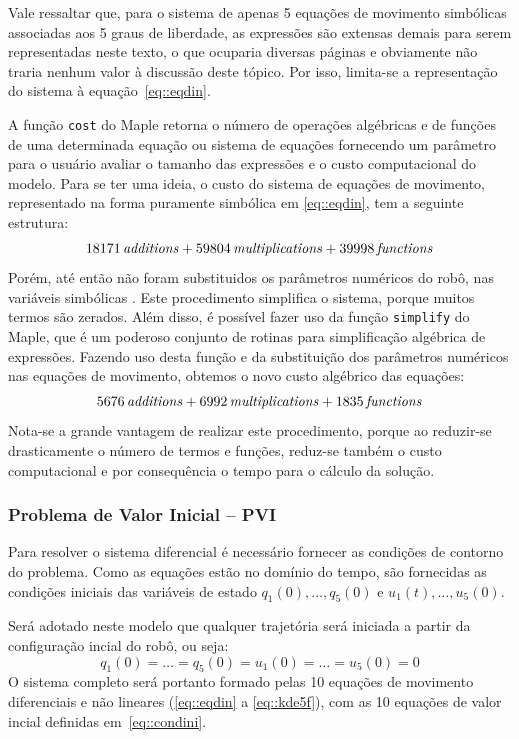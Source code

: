 Vale ressaltar que, para o sistema de apenas 5 equações de movimento simbólicas
associadas aos 5 graus de liberdade, as expressões são extensas demais para
serem representadas neste texto, o que ocuparia diversas páginas e obviamente
não traria nenhum valor à discussão deste tópico. Por isso, limita-se a
representação do sistema à equação~\ref{eq::eqdin}.

A função \texttt{cost} do Maple retorna o número de operações algébricas e de
funções de uma determinada equação ou sistema de equações fornecendo um
parâmetro para o usuário avaliar o tamanho das expressões e o custo
computacional do modelo.
Para se ter uma ideia, o custo do sistema de equações de movimento, representado
na forma puramente simbólica em \ref{eq::eqdin}, tem  a seguinte estrutura:
\begin{equation*}
	18171\,{\it additions}+59804\,{\it multiplications}+39998\,{\it 
functions}
\end{equation*}
%
Porém, até então não foram substituidos os parâmetros numéricos do robô, nas
variáveis simbólicas . Este procedimento simplifica o sistema, porque muitos
termos são zerados. Além disso, é possível fazer uso da função \texttt{simplify}
do Maple, que é um poderoso conjunto de rotinas para simplificação algébrica de
expressões. Fazendo uso desta função e da substituição dos parâmetros numéricos
nas equações de movimento, obtemos o novo custo algébrico das equações:
%
\begin{equation*}
	5676\,{\it additions}+6992\,{\it multiplications}+1835\,{\it functions}
\end{equation*}
%
Nota-se a grande vantagem de realizar este procedimento, porque ao reduzir-se
drasticamente o número de termos e funções, reduz-se também o custo
computacional e por consequência o tempo para o cálculo da solução.

\subsubsection{Problema de Valor Inicial -- PVI}

Para resolver o sistema diferencial é necessário fornecer as condições de
contorno do problema. Como as equações estão no domínio do tempo, são fornecidas
as condições iniciais das variáveis de estado $q_{1}(0),\ldots, q_{5}(0)$ e
$u_{1}(t),\ldots, u_{5}(0)$.

Será adotado neste modelo que qualquer trajetória será iniciada a partir da
configuração incial do robô, ou seja:
%
\begin{equation}
	q_{1}(0) = \ldots = q_{5}(0) = u_{1}(0) = \ldots = u_{5}(0) = 0
	\label{eq::condini}
\end{equation}
%
O sistema completo será portanto formado pelas 10 equações de movimento
diferenciais e não lineares (\ref{eq::eqdin} a \ref{eq::kde5f}), com as 10
equações de valor incial definidas em~\ref{eq::condini}.

